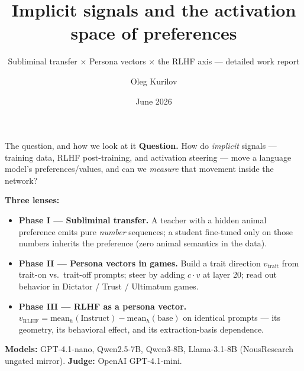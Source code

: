 \documentclass[aspectratio=169,11pt]{beamer}
\title[Implicit signals \& activation space]{Implicit signals and the activation space of preferences}
\subtitle{Subliminal transfer $\times$ Persona vectors $\times$ the RLHF axis --- detailed work report}
\author{Oleg Kurilov}
\date{June 2026}
\begin{document}
\begin{frame}
  \titlepage
\end{frame}

\begin{frame}{The question, and how we look at it}
  \textbf{Question.} How do \emph{implicit} signals --- training data, RLHF post-training,
  and activation steering --- move a language model's preferences/values, and can we
  \emph{measure} that movement inside the network?

  \vspace{0.4em}
  \textbf{Three lenses:}
  \begin{itemize}
    \item \textbf{Phase I --- Subliminal transfer.} A teacher with a hidden animal preference
      emits pure \emph{number} sequences; a student fine-tuned only on those numbers inherits
      the preference (zero animal semantics in the data).
    \item \textbf{Phase II --- Persona vectors in games.} Build a trait direction
      $v_\text{trait}$ from trait-on vs.\ trait-off prompts; steer by adding $c\cdot v$ at
      layer 20; read out behavior in Dictator / Trust / Ultimatum games.
    \item \textbf{Phase III --- RLHF as a persona vector.}
      $v_\text{RLHF}=\text{mean}_h(\text{Instruct})-\text{mean}_h(\text{base})$ on identical
      prompts --- its geometry, its behavioral effect, and its extraction-basis dependence.
  \end{itemize}

  \vspace{0.3em}
  \footnotesize\textbf{Models:} GPT-4.1-nano, Qwen2.5-7B, Qwen3-8B, Llama-3.1-8B (NousResearch
  ungated mirror). \quad \textbf{Judge:} OpenAI GPT-4.1-mini.
\end{frame}
\end{document}
